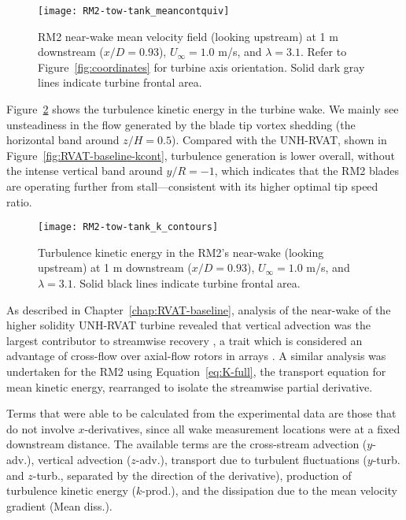 \begin{figure}
    \centering

    \texttt{[image: RM2-tow-tank\_meancontquiv]}
    
    \caption{RM2 near-wake mean velocity field (looking upstream) at 1 m
        downstream ($x/D=0.93$), $U_\infty=1.0$ m/s, and $\lambda=3.1$. Refer to
        Figure~\ref{fig:coordinates} for turbine axis orientation. Solid dark gray
        lines indicate turbine frontal area.}
    
    \label{fig:meancontquiv}
\end{figure}

Figure~\ref{fig:kcont} shows the turbulence kinetic energy in the turbine wake.
We mainly see unsteadiness in the flow generated by the blade tip vortex
shedding (the horizontal band around $z/H=0.5$). Compared with the UNH-RVAT,
shown in Figure~\ref{fig:RVAT-baseline-kcont}, turbulence generation is lower
overall, without the intense vertical band around $y/R=-1$, which indicates that
the RM2 blades are operating further from stall---consistent with its higher
optimal tip speed ratio.

\begin{figure}
    \centering

    \texttt{[image: RM2-tow-tank\_k\_contours]}
    
    \caption{Turbulence kinetic energy in the RM2's near-wake (looking upstream)
        at 1 m downstream ($x/D=0.93$), $U_\infty=1.0$ m/s, and $\lambda=3.1$. Solid
        black lines indicate turbine frontal area.}
    
    \label{fig:kcont}
\end{figure}

As described in Chapter~\ref{chap:RVAT-baseline}, analysis of the near-wake of
the higher solidity UNH-RVAT turbine revealed that vertical advection was the
largest contributor to streamwise recovery \cite{Bachant2015-JoT}, a trait which
is considered an advantage of cross-flow over axial-flow rotors in arrays
\cite{Kinzel2012}. A similar analysis was undertaken for the RM2 using
Equation~\ref{eq:K-full}, the transport equation for mean kinetic energy,
rearranged to isolate the streamwise partial derivative.

Terms that were able to be calculated from the experimental data are those that
do not involve $x$-derivatives, since all wake measurement locations were at a
fixed downstream distance. The available terms are the cross-stream advection
($y$-adv.), vertical advection ($z$-adv.), transport due to turbulent
fluctuations ($y$-turb. and $z$-turb., separated by the direction of the
derivative), production of turbulence kinetic energy ($k$-prod.), and the
dissipation due to the mean velocity gradient (Mean diss.).

